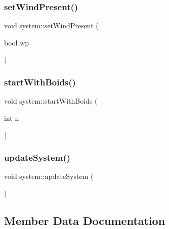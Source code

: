 \mbox{\label{classsystem_aac2e508631be50e2de05b8cbe09c72f3}} 
\subsubsection{\texorpdfstring{set\+Wind\+Present()}{setWindPresent()}}
{\footnotesize\ttfamily void system\+::set\+Wind\+Present (\begin{DoxyParamCaption}\item[{bool}]{wp }\end{DoxyParamCaption})}

\mbox{\label{classsystem_afaa7d0f7cdf10d2fae3006fa8968faf6}} 
\subsubsection{\texorpdfstring{start\+With\+Boids()}{startWithBoids()}}
{\footnotesize\ttfamily void system\+::start\+With\+Boids (\begin{DoxyParamCaption}\item[{int}]{n }\end{DoxyParamCaption})}

\mbox{\label{classsystem_af33dc747b3b401f50beb14721b507e84}} 
\subsubsection{\texorpdfstring{update\+System()}{updateSystem()}}
{\footnotesize\ttfamily void system\+::update\+System (\begin{DoxyParamCaption}{ }\end{DoxyParamCaption})}



\subsection{Member Data Documentation}
\mbox{\label{classsystem_a793bb926129ed3a0e339963f7c946b38}} 
